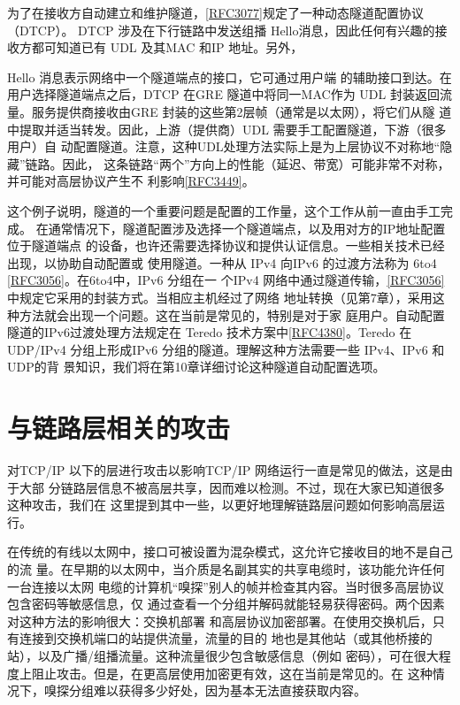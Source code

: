 为了在接收方自动建立和维护隧道，\href{https://www.rfc-editor.org/rfc/rfc3077}{[RFC3077]}规定了一种动态隧道配置协议（DTCP）。
DTCP 涉及在下行链路中发送组播 Hello消息，因此任何有兴趣的接收方都可知道已有 UDL
及其MAC 和IP 地址。另外，

Hello 消息表示网络中一个隧道端点的接口，它可通过用户端
的辅助接口到达。在用户选择隧道端点之后，DTCP 在GRE 隧道中将同一MAC作为 UDL
封装返回流量。服务提供商接收由GRE 封装的这些第2层帧（通常是以太网），将它们从隧
道中提取并适当转发。因此，上游（提供商）UDL 需要手工配置隧道，下游（很多用户）自
动配置隧道。注意，这种UDL处理方法实际上是为上层协议不对称地“隐藏”链路。因此，
这条链路“两个”方向上的性能（延迟、带宽）可能非常不对称，并可能对高层协议产生不
利影响\href{https://www.rfc-editor.org/rfc/rfc3449}{[RFC3449]}。

这个例子说明，隧道的一个重要问题是配置的工作量，这个工作从前一直由手工完成。
在通常情况下，隧道配置涉及选择一个隧道端点，以及用对方的IP地址配置位于隧道端点
的设备，也许还需要选择协议和提供认证信息。一些相关技术已经出现，以协助自动配置或
使用隧道。一种从 IPv4 向IPv6 的过渡方法称为 6to4 \href{https://www.rfc-editor.org/rfc/rfc3056}{[RFC3056]}。在6to4中，IPv6 分组在一
个IPv4 网络中通过隧道传输，\href{https://www.rfc-editor.org/rfc/rfc3056}{[RFC3056]}中规定它采用的封装方式。当相应主机经过了网络
地址转换（见第7章），采用这种方法就会出现一个问题。这在当前是常见的，特别是对于家
庭用户。自动配置隧道的IPv6过渡处理方法规定在 Teredo 技术方案中\href{https://www.rfc-editor.org/rfc/rfc4380}{[RFC4380]}。Teredo
在UDP/IPv4 分组上形成IPv6 分组的隧道。理解这种方法需要一些 IPv4、IPv6 和UDP的背
景知识，我们将在第10章详细讨论这种隧道自动配置选项。

\section{与链路层相关的攻击}

对TCP/IP 以下的层进行攻击以影响TCP/IP 网络运行一直是常见的做法，这是由于大部
分链路层信息不被高层共享，因而难以检测。不过，现在大家已知道很多这种攻击，我们在
这里提到其中一些，以更好地理解链路层问题如何影响高层运行。

在传统的有线以太网中，接口可被设置为混杂模式，这允许它接收目的地不是自己的流
量。在早期的以太网中，当介质是名副其实的共享电缆时，该功能允许任何一台连接以太网
电缆的计算机“嗅探”别人的帧并检查其内容。当时很多高层协议包含密码等敏感信息，仅
通过查看一个分组并解码就能轻易获得密码。两个因素对这种方法的影响很大：交换机部署
和高层协议加密部署。在使用交换机后，只有连接到交换机端口的站提供流量，流量的目的
地也是其他站（或其他桥接的站），以及广播/组播流量。这种流量很少包含敏感信息（例如
密码），可在很大程度上阻止攻击。但是，在更高层使用加密更有效，这在当前是常见的。在
这种情况下，嗅探分组难以获得多少好处，因为基本无法直接获取内容。

